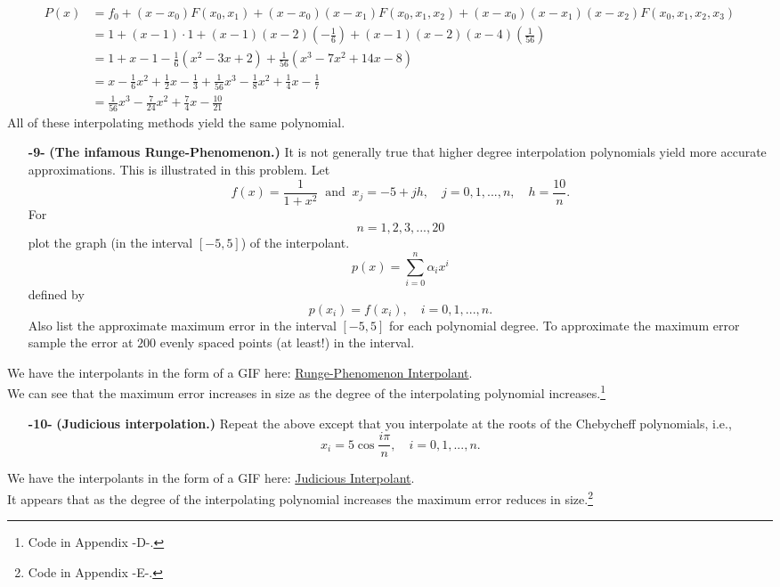 \documentclass[11pt]{article}
\theoremstyle{definition}
\newcommand{\1}[1]{\mathbf{1} \left \{ #1 \right \}}
\begin{document}
\begin{equation*}
    \begin{split}
        P(x) &= f_0 + (x-x_0) F(x_0 , x_1) + (x-x_0)(x-x_1) F(x_0 , x_1 , x_2) + (x-x_0)(x-x_1)(x-x_2) F(x_0 , x_1 , x_2 , x_3) \\
        &= 1 + (x-1) \cdot 1 + (x-1)(x-2)\left(-\frac{1}{6}\right) + (x-1)(x-2)(x-4)\left(\frac{1}{56}\right) \\
        &= 1 + x - 1 - \frac{1}{6}(x^2 -3x+2) + \frac{1}{56}(x^3 -7x^2 +14x-8) \\
        &= x - \frac{1}{6}x^2 + \frac{1}{2}x - \frac{1}{3} + \frac{1}{56}x^3 - \frac{1}{8}x^2 + \frac{1}{4}x - \frac{1}{7} \\
        &= \frac{1}{56}x^3 - \frac{7}{24}x^2 + \frac{7}{4}x - \frac{10}{21}
    \end{split}
\end{equation*}
All of these interpolating methods yield the same polynomial.

\begin{itemize}
    \item[{\textbf{-9-}}] \textbf{(The infamous Runge-Phenomenon.)}  It is not generally true that higher degree interpolation polynomials yield more accurate approximations.  This is illustrated in this problem.  Let
    \[f(x) = \frac{1}{1+x^2} \ \text{ and } \ x_j = -5+jh, \quad j = 0,1,...,n, \quad h=\frac{10}{n}.\]
    For
    \[n = 1,2,3,...,20\]
    plot the graph (in the interval $[-5,5]$) of the interpolant.
    \[p(x) = \sum_{i=0}^n \alpha_i x^i\]
    defined by
    \[p(x_i) = f(x_i), \quad i = 0,1,...,n.\]
    Also list the approximate maximum error in the interval $[-5,5]$ for each polynomial degree.  To approximate the maximum error sample the error at $200$ evenly spaced points (at least!) in the interval.
\end{itemize}
We have the interpolants in the form of a GIF here: \href{https://github.com/3rundane/Numerical-Analysis-Project/blob/main/homework\%202\%20gifs/problem9.gif}{Runge-Phenomenon Interpolant}. \\
We can see that the maximum error increases in size as the degree of the interpolating polynomial increases.\footnote{Code in Appendix -D-.}

\begin{itemize}
    \item[{\textbf{-10-}}] \textbf{(Judicious interpolation.)}  Repeat the above except that you interpolate at the roots of the Chebycheff polynomials, i.e.,
    \begin{equation}
        x_i = 5\cos \frac{i\pi}{n}, \quad i=0,1,...,n.
    \end{equation}
\end{itemize}
We have the interpolants in the form of a GIF here: \href{https://github.com/3rundane/Numerical-Analysis-Project/blob/main/homework\%202\%20gifs/problem10.gif}{Judicious Interpolant}. \\
It appears that as the degree of the interpolating polynomial increases the maximum error reduces in size.\footnote{Code in Appendix -E-.}
\end{document}
